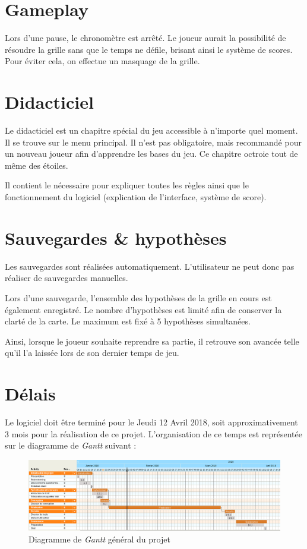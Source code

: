 \documentclass[a4paper, 12pt]{report}
\begin{document}
	\section{Gameplay}
	
		Lors d'une pause, le chronomètre est arrêté. Le joueur aurait la possibilité de résoudre la grille sans que le temps ne défile, brisant ainsi le système de scores. 
		Pour éviter cela, on effectue un masquage de la grille.
		
	\section{Didacticiel}
	
		Le didacticiel est un chapitre spécial du jeu accessible à n'importe quel moment. Il se trouve sur le menu principal. 
		Il n'est pas obligatoire, mais recommandé pour un nouveau joueur afin d'apprendre les bases du jeu. Ce chapitre octroie tout de même des étoiles.
		
		Il contient le nécessaire pour expliquer toutes les règles ainsi que le fonctionnement du logiciel (explication de l'interface, système de score).


	\section{Sauvegardes \& hypothèses}
	
		Les sauvegardes sont réalisées automatiquement. L'utilisateur ne peut donc pas réaliser de sauvegardes manuelles. 
		
		Lors d'une sauvegarde, l'ensemble des hypothèses de la grille en cours est également enregistré. Le nombre d'hypothèses est limité afin de conserver la clarté de la carte. Le maximum est fixé à 5 hypothèses simultanées.
		
		Ainsi, lorsque le joueur souhaite reprendre sa partie, il retrouve son avancée telle qu'il l'a laissée lors de son dernier temps de jeu.
	
	\section{Délais}
	
		Le logiciel doit être terminé pour le Jeudi 12 Avril 2018, soit approximativement 3 mois pour la réalisation de ce projet. L'organisation de ce temps est représentée sur le diagramme de \textit{Gantt} suivant :

	\begin{figure}[H]
		\centering
		\caption{Diagramme de \textit{Gantt} général du projet}
		\includegraphics[width=17cm]{ganttGeneral.png}
	\end{figure}	     
		
\end{document}
